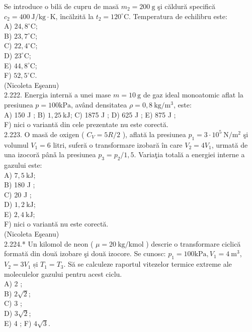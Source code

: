 \documentclass[10pt]{article}
\begin{document}
Se introduce o bilă de cupru de masă $m_{2}=200 \mathrm{~g}$ şi căldură specifică $c_{2}=400 \mathrm{~J} / \mathrm{kg} \cdot \mathrm{K}$, încălzită la $t_{2}=120^{\circ} \mathrm{C}$. Temperatura de echilibru este:\\
A) $24,8^{\circ} \mathrm{C}$;\\
B) $23,7^{\circ} \mathrm{C}$;\\
C) $22,4^{\circ} \mathrm{C}$;\\
D) $23^{\circ} \mathrm{C}$;\\
E) $44,8^{\circ} \mathrm{C}$;\\
F) $52,5^{\circ} \mathrm{C}$.\\
(Nicoleta Eşeanu)\\
2.222. Energia internă a unei mase $m=10 \mathrm{~g}$ de gaz ideal monoatomic aflat la presiunea $p=100 \mathrm{kPa}$, având densitatea $\rho=0,8 \mathrm{~kg} / \mathrm{m}^{3}$, este:\\
A) 150 J ; B) $1,25 \mathrm{~kJ}$; C) 1875 J ; D) 625 J ; E) 875 J ;\\
F) nici o variantă din cele prezentate nu este corectă.\\
2.223. O masă de oxigen ( $C_{V}=5 R / 2$ ), aflată la presiunea $p_{1}=3 \cdot 10^{5} \mathrm{~N} / \mathrm{m}^{2}$ şi volumul $V_{1}=6$ litri, suferă o transformare izobară în care $V_{2}=4 V_{1}$, urmată de una izocoră pânǎ la presiunea $p_{3}=p_{2} / 1,5$. Variaţia totală a energiei interne a gazului este:\\
A) $7,5 \mathrm{~kJ}$;\\
B) 180 J ;\\
C) 20 J ;\\
D) $1,2 \mathrm{~kJ}$;\\
E) $2,4 \mathrm{~kJ}$;\\
F) nici o variantă nu este corectă.\\
(Nicoleta Eşeanu)\\
2.224.* Un kilomol de neon ( $\mu=20 \mathrm{~kg} / \mathrm{kmol}$ ) descrie o transformare ciclică formată din două izobare şi două izocore. Se cunosc: $p_{1}=100 \mathrm{kPa}, V_{1}=4 \mathrm{~m}^{3}$, $V_{2}=3 V_{1}$ și $T_{1}=T_{3}$. Să se calculeze raportul vitezelor termice extreme ale moleculelor gazului pentru acest ciclu.\\
A) 2 ;\\
B) $2 \sqrt{2}$;\\
C) 3 ;\\
D) $3 \sqrt{2}$;\\
E) 4 ; F) $4 \sqrt{3}$.\\
\end{document}
